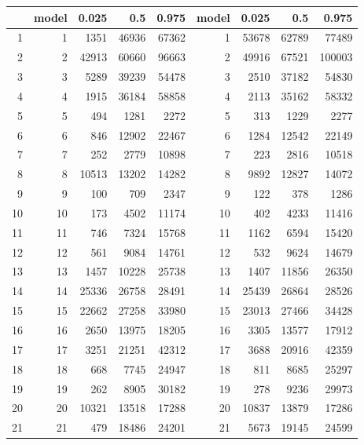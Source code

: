 \documentclass{article}
\begin{document}
\begin{table}[ht]
\centering
\begin{tabular}{rrrrrrrrr}
  \hline
 & model & 0.025 & 0.5 & 0.975 & model & 0.025 & 0.5 & 0.975 \\ 
  \hline
1 & 1 & 1351 & 46936 & 67362 & 1 & 53678 & 62789 & 77489 \\ 
  2 & 2 & 42913 & 60660 & 96663 & 2 & 49916 & 67521 & 100003 \\ 
  3 & 3 & 5289 & 39239 & 54478 & 3 & 2510 & 37182 & 54830 \\ 
  4 & 4 & 1915 & 36184 & 58858 & 4 & 2113 & 35162 & 58332 \\ 
  5 & 5 & 494 & 1281 & 2272 & 5 & 313 & 1229 & 2277 \\ 
  6 & 6 & 846 & 12902 & 22467 & 6 & 1284 & 12542 & 22149 \\ 
  7 & 7 & 252 & 2779 & 10898 & 7 & 223 & 2816 & 10518 \\ 
  8 & 8 & 10513 & 13202 & 14282 & 8 & 9892 & 12827 & 14072 \\ 
  9 & 9 & 100 & 709 & 2347 & 9 & 122 & 378 & 1286 \\ 
  10 & 10 & 173 & 4502 & 11174 & 10 & 402 & 4233 & 11416 \\ 
  11 & 11 & 746 & 7324 & 15768 & 11 & 1162 & 6594 & 15420 \\ 
  12 & 12 & 561 & 9084 & 14761 & 12 & 532 & 9624 & 14679 \\ 
  13 & 13 & 1457 & 10228 & 25738 & 13 & 1407 & 11856 & 26350 \\ 
  14 & 14 & 25336 & 26758 & 28491 & 14 & 25439 & 26864 & 28526 \\ 
  15 & 15 & 22662 & 27258 & 33980 & 15 & 23013 & 27466 & 34428 \\ 
  16 & 16 & 2650 & 13975 & 18205 & 16 & 3305 & 13577 & 17912 \\ 
  17 & 17 & 3251 & 21251 & 42312 & 17 & 3688 & 20916 & 42359 \\ 
  18 & 18 & 668 & 7745 & 24947 & 18 & 811 & 8685 & 25297 \\ 
  19 & 19 & 262 & 8905 & 30182 & 19 & 278 & 9236 & 29973 \\ 
  20 & 20 & 10321 & 13518 & 17288 & 20 & 10837 & 13879 & 17286 \\ 
  21 & 21 & 479 & 18486 & 24201 & 21 & 5673 & 19145 & 24599 \\ 
   \hline
\end{tabular}
\end{table}
\end{document}
